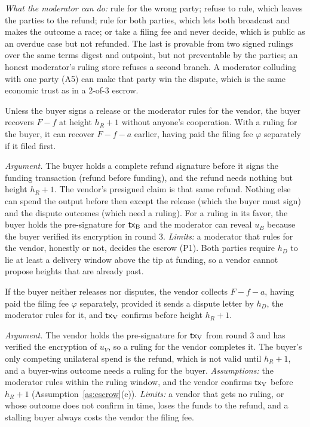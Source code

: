\emph{What the moderator can do:} rule for the wrong party; refuse to rule, which leaves the parties to the refund; rule for both parties, which lets both broadcast and makes the outcome a race; or take a filing fee and never decide, which is public as an overdue case but not refunded. The last is provable from two signed rulings over the same terms digest and outpoint, but not preventable by the parties; an honest moderator's ruling store refuses a second branch. A moderator colluding with one party (A5) can make that party win the dispute, which is the same economic trust as in a 2-of-3 escrow.

\begin{property}
Unless the buyer signs a release or the moderator rules for the vendor, the buyer recovers $F-f$ at height $h_R+1$ without anyone's cooperation. With a ruling for the buyer, it can recover $F-f-a$ earlier, having paid the filing fee $\varphi$ separately if it filed first.
\end{property}
\noindent\emph{Argument.} The buyer holds a complete refund signature before it signs the funding transaction (refund before funding), and the refund needs nothing but height $h_R+1$. The vendor's presigned claim is that same refund. Nothing else can spend the output before then except the release (which the buyer must sign) and the dispute outcomes (which need a ruling). For a ruling in its favor, the buyer holds the pre-signature for $\mathsf{tx}_{\mathrm{B}}$ and the moderator can reveal $u_B$ because the buyer verified its encryption in round 3. \emph{Limits:} a moderator that rules for the vendor, honestly or not, decides the escrow (P1). Both parties require $h_D$ to lie at least a delivery window above the tip at funding, so a vendor cannot propose heights that are already past.

\begin{property}
If the buyer neither releases nor disputes, the vendor collects $F-f-a$, having paid the filing fee $\varphi$ separately, provided it sends a dispute letter by $h_D$, the moderator rules for it, and $\mathsf{tx}_{\mathrm{V}}$ confirms before height $h_R+1$.
\end{property}
\noindent\emph{Argument.} The vendor holds the pre-signature for $\mathsf{tx}_{\mathrm{V}}$ from round 3 and has verified the encryption of $u_V$, so a ruling for the vendor completes it. The buyer's only competing unilateral spend is the refund, which is not valid until $h_R+1$, and a buyer-wins outcome needs a ruling for the buyer. \emph{Assumptions:} the moderator rules within the ruling window, and the vendor confirms $\mathsf{tx}_{\mathrm{V}}$ before $h_R+1$ (Assumption~\ref{as:escrow}(e)). \emph{Limits:} a vendor that gets no ruling, or whose outcome does not confirm in time, loses the funds to the refund, and a stalling buyer always costs the vendor the filing fee.

